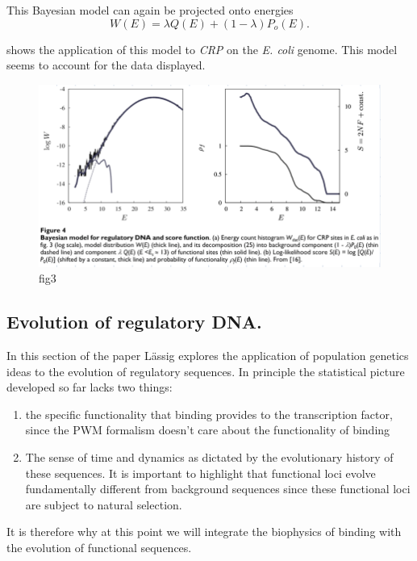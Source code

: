 This Bayesian model can again be projected onto energies
\begin{equation}
  W(E) = \lambda Q(E) + (1 - \lambda) P_o(E).
\end{equation}

 shows the application of this model to {\it CRP} on the
{\it E. coli} genome. This model seems to account for the data displayed.

\begin{figure}[h!]
	\centering \includegraphics[scale=0.5]{../fig/lassig_2007/fig4.png}
	\caption{fig3}
  \label{fig_bayesian_dna}
\end{figure}

\subsection{Evolution of regulatory DNA.}

In this section of the paper L\"{a}ssig explores the application of population
genetics ideas to the evolution of regulatory sequences. In principle the
statistical picture developed so far lacks two things:
\begin{enumerate}
  \item the specific functionality that binding provides to the transcription
  factor, since the PWM formalism doesn't care about the functionality of
  binding
  \item The sense of time and dynamics as dictated by the evolutionary history
  of these sequences. It is important to highlight that functional loci evolve
  fundamentally different from background sequences since these functional loci
  are subject to natural selection.
\end{enumerate}
It is therefore why at this point we will integrate the biophysics of binding
with the evolution of functional sequences.


